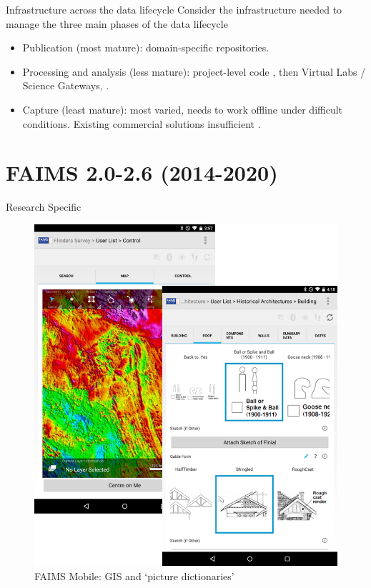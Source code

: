 \documentclass[aspectratio=169, 12pt]{beamer} %
\begin{document}
\begin{frame}{Infrastructure across the data lifecycle}
    Consider the infrastructure needed to manage the three main phases of the data lifecycle
    \begin{itemize}[label=\textbullet]
        \item Publication (most mature): domain-specific repositories.
        \item Processing and analysis (less mature): project-level code \cite{Stewart_Lowndes2017-lj}, then Virtual Labs / Science Gateways, \cite{Alveo2019-tk}.
        \item Capture (least mature): most varied, needs to work offline under difficult conditions. Existing commercial solutions insufficient \cite{Bureau_of_Reclamation2017-xl}.
    \end{itemize}
\end{frame}


\section{FAIMS 2.0-2.6 (2014-2020)}

\begin{frame}{Research Specific}
 \begin{figure}[H]
    \centering
        \includegraphics[height=.75\textheight]{figures/FAIMS-screenshots.png}
        \caption{FAIMS Mobile: GIS and `picture dictionaries'}
        \label{fig:FAIMS-mobile-screenshots}
 \end{figure}
\end{frame}
\end{document}
